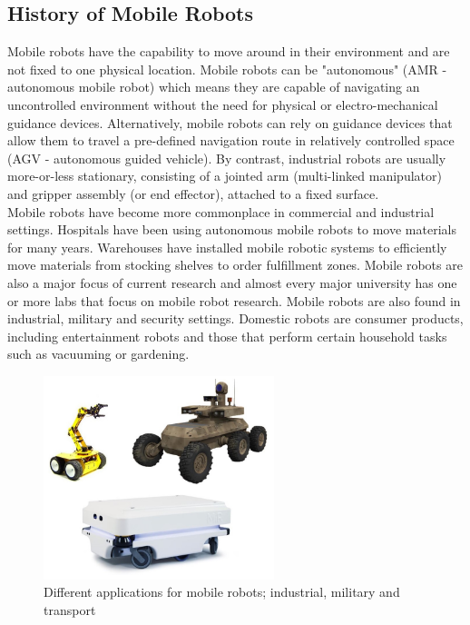\documentclass[12pt]{article}
\begin{document}
\subsection{History of Mobile Robots} 
Mobile robots have the capability to move around in their environment and are not fixed to one physical location. Mobile robots can be "autonomous" (AMR - autonomous mobile robot) which means they are capable of navigating an uncontrolled environment without the need for physical or electro-mechanical guidance devices. Alternatively, mobile robots can rely on guidance devices that allow them to travel a pre-defined navigation route in relatively controlled space (AGV - autonomous guided vehicle). By contrast, industrial robots are usually more-or-less stationary, consisting of a jointed arm (multi-linked manipulator) and gripper assembly (or end effector), attached to a fixed surface.\\
Mobile robots have become more commonplace in commercial and industrial settings. Hospitals have been using autonomous mobile robots to move materials for many years. Warehouses have installed mobile robotic systems to efficiently move materials from stocking shelves to order fulfillment zones. Mobile robots are also a major focus of current research and almost every major university has one or more labs that focus on mobile robot research. Mobile robots are also found in industrial, military and security settings. Domestic robots are consumer products, including entertainment robots and those that perform certain household tasks such as vacuuming or gardening. \cite{202}


\begin{figure}[H]
 \centering
\includegraphics[width =0.6\textwidth]{Fig/mobile_robots_apps.jpg}
\caption{Different applications for mobile robots; industrial, military and transport}

\end{figure}
\end{document}
